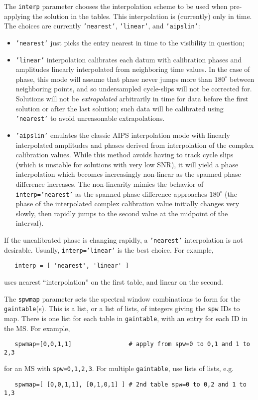 The {\tt interp} parameter chooses the interpolation scheme to be used
when pre-applying the solution in the tables.  This interpolation is
(currently) only in time.
The choices are currently {\tt 'nearest'}, {\tt 'linear'}, and {\tt 'aipslin'}:
\begin{itemize}
\item {\tt 'nearest'} just picks the entry nearest in time to the
   visibility in question;

\item {\tt 'linear'} interpolation calibrates each datum with
   calibration phases and amplitudes linearly 
   interpolated from neighboring time values. In the case of phase,
   this mode will assume that phase never jumps more than $180^\circ$
   between neighboring points, and so undersampled cycle-slips will
   not be corrected for.  Solutions will not be {\em extrapolated}
   arbitrarily in time for data before the first solution or after
   the last solution; such data will be calibrated using {\tt
   'nearest'} to avoid unreasonable extrapolations.


\item {\tt 'aipslin'} emulates the classic AIPS interpolation mode with
   linearly interpolated amplitudes and phases derived from
   interpolation of the complex calibration values. While this method
   avoids having to track cycle slips (which is unstable for solutions
   with very low SNR), it will yield a phase interpolation which becomes
   increasingly non-linear as the spanned phase difference increases. The
   non-linearity mimics the behavior of {\tt interp='nearest'} as the spanned
   phase difference approaches $180^\circ$ (the phase of the interpolated
   complex calibration value initially changes very slowly, then rapidly
   jumps to the second value at the midpoint of the interval).
\end{itemize}

If the uncalibrated phase is changing rapidly, a {\tt 'nearest'}
interpolation is not desirable. Usually, {\tt interp='linear'} is the
best choice. For example,
\small
\begin{verbatim}
   interp = [ 'nearest', 'linear' ]
\end{verbatim}
\normalsize
uses nearest ``interpolation'' on the first table, and linear
on the second.

The {\tt spwmap} parameter sets the spectral window combinations to
form for the {\tt gaintable}(s).  This is a list, or a list of lists,
of integers giving the {\tt spw} IDs to map.  There is one list for
each table in {\tt gaintable}, with an entry for each ID in the MS.
For example,
\small
\begin{verbatim}
   spwmap=[0,0,1,1]                # apply from spw=0 to 0,1 and 1 to 2,3
\end{verbatim}
\normalsize
for an MS with {\tt spw=0,1,2,3}.  For multiple {\tt gaintable}, use
lists of lists, e.g.
\small
\begin{verbatim}
   spwmap=[ [0,0,1,1], [0,1,0,1] ] # 2nd table spw=0 to 0,2 and 1 to 1,3
\end{verbatim} 
\normalsize


